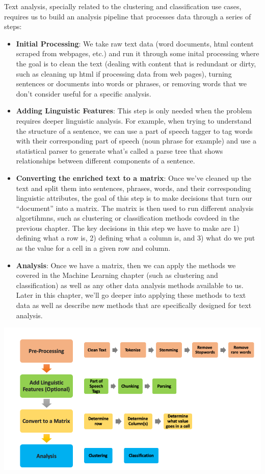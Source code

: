 \documentclass[]{krantz}
\begin{document}
Text analysis, specially related to the clustering and classification
use cases, requires us to build an analysis pipeline that processes data
through a series of steps:

\begin{itemize}
\item
  \textbf{Initial Processing}: We take raw text data (word documents,
  html content scraped from webpages, etc.) and run it through some
  inital processing where the goal is to clean the text (dealing with
  content that is redundant or dirty, such as cleaning up html if
  processing data from web pages), turning sentences or documents into
  words or phrases, or removing words that we don't consider useful for
  a specific analysis.
\item
  \textbf{Adding Linguistic Features}: This step is only needed when the
  problem requires deeper linguistic analysis. For example, when trying
  to understand the structure of a sentence, we can use a part of speech
  tagger to tag words with their corresponding part of speech (noun
  phrase for example) and use a statistical parser to generate what's
  called a parse tree that shows relationships between different
  components of a sentence.
\item
  \textbf{Converting the enriched text to a matrix}: Once we've cleaned
  up the text and split them into sentences, phrases, words, and their
  corresponding linguistic attributes, the goal of this step is to make
  decisions that turn our ``document'' into a matrix. The matrix is then
  used to run different analysis algortihmns, such as clustering or
  classification methods covdeed in the previous chapter. The key
  decisions in this step we have to make are 1) defining what a row is,
  2) defining what a column is, and 3) what do we put as the value for a
  cell in a given row and column.
\item
  \textbf{Analysis}: Once we have a matrix, then we can apply the
  methods we covered in the Machine Learning chapter (such as clustering
  and classification) as well as any other data analysis methods
  available to us. Later in this chapter, we'll go deeper into applying
  these methods to text data as well as describe new methods that are
  specifically designed for text analysis.
\end{itemize}

\begin{center}\includegraphics[width=0.7\linewidth]{ChapterText/figures/textanalysispipeline} \end{center}
\end{document}
